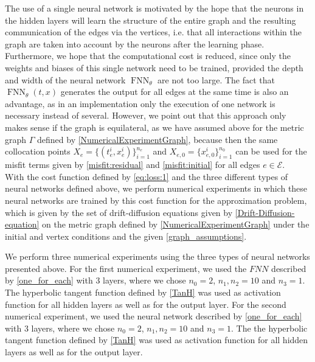 The use of a single neural network is motivated by the hope that the neurons in the hidden layers will learn the structure of the entire graph and the resulting communication of the edges via the vertices, i.e. that all interactions within the graph are taken into account by the neurons after the learning phase. Furthermore, we hope that the computational cost is reduced, since only the weights and biases of this single network need to be trained, provided the depth and width of the neural network $\operatorname{FNN}_{\theta}$ are not too large. The fact that $\operatorname{FNN}_{\theta}\left(t, x\right)$ generates the output for all edges at the same time is also an advantage, as in an implementation only the execution of one network is necessary instead of several. However, we point out that this approach only makes sense if the graph is equilateral, as we have assumed above for the metric graph $\Gamma$ defined by \cref{NumericalExperimentGraph}, because then the same collocation points $X_e = \{ \left( t_e^i, x_e^i \right)\}_{i=1}^{n_e}$ and $X_{e,0} = \{x_{e,0}^i\}_{i=1}^{n_0}$ can be used for the misfit terms given by \cref{misfit:residual} and \cref{misfit:initial} for all edges $e \in \mathcal{E}$. \\


With the cost function defined by \cref{eq:loss:1} and the three different types of neural networks defined above, we perform numerical experiments in which these neural networks are trained by this cost function for the approximation problem, which is given by the set of drift-diffusion equations given by \cref{Drift-Diffusion-equation} on the metric graph defined by \cref{NumericalExperimentGraph} under the initial and vertex conditions and the given \cref{graph_assumptions}.

We perform three numerical experiments using the three types of neural networks presented above. For the first numerical experiment, we used the $FNN$ described by \cref{one_for_each} with $3$ layers, where we chose $n_0 = 2$, $n_1, n_2 = 10$ and $n_3 = 1$. The hyperbolic tangent function defined by \cref{TanH} was used as activation function for all hidden layers as well as for the output layer. For the second numerical experiment, we used the neural network described by \cref{one_for_each} with $3$ layers, where we chose $n_0 = 2$, $n_1, n_2 = 10$ and $n_3 = 1$. The the hyperbolic tangent function defined by \cref{TanH} was used as activation function for all hidden layers as well as for the output layer.




